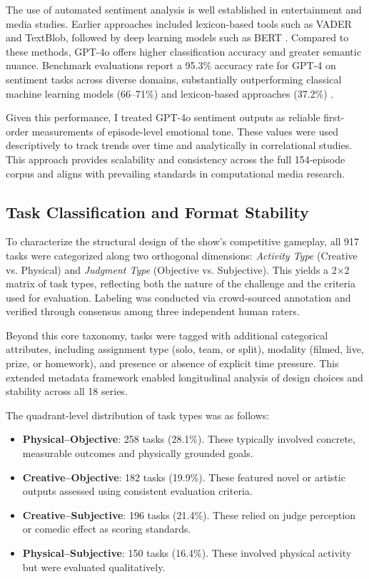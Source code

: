 \documentclass[10pt,letterpaper]{article}
\begin{document}
The use of automated sentiment analysis is well established in entertainment and media studies. Earlier approaches included lexicon-based tools such as VADER and TextBlob, followed by deep learning models such as BERT \cite{Hutto2014,Devlin2018}. Compared to these methods, GPT-4o offers higher classification accuracy and greater semantic nuance. Benchmark evaluations report a 95.3\% accuracy rate for GPT-4 on sentiment tasks across diverse domains, substantially outperforming classical machine learning models (66–71\%) and lexicon-based approaches (37.2\%) \cite{Fu2024, Debess2024}.

Given this performance, I treated GPT-4o sentiment outputs as reliable first-order measurements of episode-level emotional tone. These values were used descriptively to track trends over time and analytically in correlational studies. This approach provides scalability and consistency across the full 154-episode corpus and aligns with prevailing standards in computational media research.

\subsection*{Task Classification and Format Stability}

To characterize the structural design of the show’s competitive gameplay, all 917 tasks were categorized along two orthogonal dimensions: \textit{Activity Type} (Creative vs. Physical) and \textit{Judgment Type} (Objective vs. Subjective). This yields a 2×2 matrix of task types, reflecting both the nature of the challenge and the criteria used for evaluation. Labeling was conducted via crowd-sourced annotation and verified through consensus among three independent human raters.

Beyond this core taxonomy, tasks were tagged with additional categorical attributes, including assignment type (solo, team, or split), modality (filmed, live, prize, or homework), and presence or absence of explicit time pressure. This extended metadata framework enabled longitudinal analysis of design choices and stability across all 18 series.

The quadrant-level distribution of task types was as follows:
\begin{itemize}
  \item \textbf{Physical–Objective}: 258 tasks (28.1\%). These typically involved concrete, measurable outcomes and physically grounded goals.
  \item \textbf{Creative–Objective}: 182 tasks (19.9\%). These featured novel or artistic outputs assessed using consistent evaluation criteria.
  \item \textbf{Creative–Subjective}: 196 tasks (21.4\%). These relied on judge perception or comedic effect as scoring standards.
  \item \textbf{Physical–Subjective}: 150 tasks (16.4\%). These involved physical activity but were evaluated qualitatively.
\end{itemize}
\end{document}
